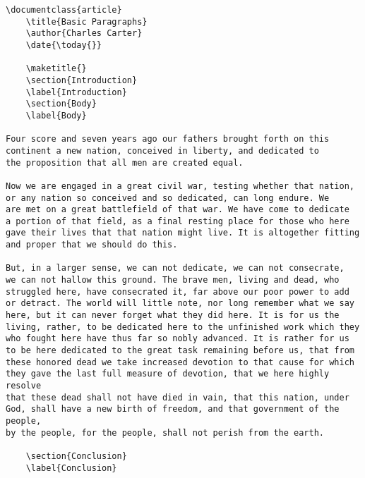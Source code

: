         \begin{verbatim}
\documentclass{article}
    \title{Basic Paragraphs}
    \author{Charles Carter}
    \date{\today{}}
 
    \maketitle{}
    \section{Introduction}
    \label{Introduction}
    \section{Body}
    \label{Body}

Four score and seven years ago our fathers brought forth on this 
continent a new nation, conceived in liberty, and dedicated to 
the proposition that all men are created equal.

Now we are engaged in a great civil war, testing whether that nation, 
or any nation so conceived and so dedicated, can long endure. We 
are met on a great battlefield of that war. We have come to dedicate 
a portion of that field, as a final resting place for those who here 
gave their lives that that nation might live. It is altogether fitting 
and proper that we should do this.

But, in a larger sense, we can not dedicate, we can not consecrate, 
we can not hallow this ground. The brave men, living and dead, who 
struggled here, have consecrated it, far above our poor power to add 
or detract. The world will little note, nor long remember what we say 
here, but it can never forget what they did here. It is for us the 
living, rather, to be dedicated here to the unfinished work which they 
who fought here have thus far so nobly advanced. It is rather for us 
to be here dedicated to the great task remaining before us, that from 
these honored dead we take increased devotion to that cause for which 
they gave the last full measure of devotion, that we here highly resolve 
that these dead shall not have died in vain, that this nation, under 
God, shall have a new birth of freedom, and that government of the people, 
by the people, for the people, shall not perish from the earth.

    \section{Conclusion}
    \label{Conclusion}
    
        \end{verbatim}
        

